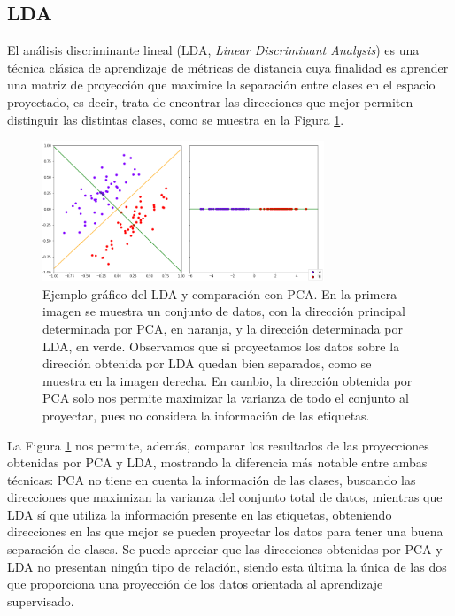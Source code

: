 
\subsection{LDA}

El análisis discriminante lineal (LDA, \emph{Linear Discriminant Analysis}) es una técnica clásica de aprendizaje de métricas de distancia cuya finalidad es aprender una matriz de proyección que maximice la separación entre clases en el espacio proyectado, es decir, trata de encontrar las direcciones que mejor permiten distinguir las distintas clases, como se muestra en la Figura \ref{fig:lda}.

\begin{figure}[h]
    \centering
    \includegraphics[width=0.75\textwidth]{./images/lda.png}
    \caption{Ejemplo gráfico del LDA y comparación con PCA. En la primera imagen se muestra un conjunto de datos, con la dirección principal determinada por PCA, en naranja, y la dirección determinada por LDA, en verde. Observamos que si proyectamos los datos sobre la dirección obtenida por LDA quedan bien separados, como se muestra en la imagen derecha. En cambio, la dirección obtenida por PCA solo nos permite maximizar la varianza de todo el conjunto al proyectar, pues no considera la información de las etiquetas.} \label{fig:lda}
\end{figure}


La Figura \ref{fig:lda} nos permite, además, comparar los resultados de las proyecciones obtenidas por PCA y LDA, mostrando la diferencia más notable entre ambas técnicas: PCA no tiene en cuenta la información de las clases, buscando las direcciones que maximizan la varianza del conjunto total de datos, mientras que LDA sí que utiliza la información presente en las etiquetas, obteniendo direcciones en las que mejor se pueden proyectar los datos para tener una buena separación de clases. Se puede apreciar que las direcciones obtenidas por PCA y LDA no presentan ningún tipo de relación, siendo esta última la única de las dos que proporciona una proyección de los datos orientada al aprendizaje supervisado. 

